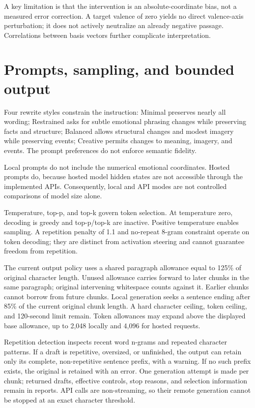 \documentclass[manuscript,screen,nonacm]{acmart}
\begin{document}
A key limitation is that the intervention is an absolute-coordinate
bias, not a measured error correction. A target valence of zero yields
no direct valence-axis perturbation; it does not actively neutralize an
already negative passage. Correlations between basis vectors further
complicate interpretation.

\section{Prompts, sampling, and bounded
output}\label{prompts-sampling-and-bounded-output}

Four rewrite styles constrain the instruction: Minimal preserves nearly
all wording; Restrained asks for subtle emotional phrasing changes while
preserving facts and structure; Balanced allows structural changes and
modest imagery while preserving events; Creative permits changes to
meaning, imagery, and events. The prompt preferences do not enforce
semantic fidelity.

Local prompts do not include the numerical emotional coordinates. Hosted
prompts do, because hosted model hidden states are not accessible
through the implemented APIs. Consequently, local and API modes are not
controlled comparisons of model size alone.

Temperature, top-p, and top-k govern token selection. At temperature
zero, decoding is greedy and top-p/top-k are inactive. Positive
temperature enables sampling. A repetition penalty of 1.1 and no-repeat
8-gram constraint operate on token decoding; they are distinct from
activation steering and cannot guarantee freedom from repetition.

The current output policy uses a shared paragraph allowance equal to
125\% of original character length. Unused allowance carries forward to
later chunks in the same paragraph; original intervening whitespace
counts against it. Earlier chunks cannot borrow from future chunks.
Local generation seeks a sentence ending after 85\% of the current
original chunk length. A hard character ceiling, token ceiling, and
120-second limit remain. Token allowances may expand above the displayed
base allowance, up to 2,048 locally and 4,096 for hosted requests.

Repetition detection inspects recent word n-grams and repeated character
patterns. If a draft is repetitive, oversized, or unfinished, the output
can retain only its complete, non-repetitive sentence prefix, with a
warning. If no such prefix exists, the original is retained with an
error. One generation attempt is made per chunk; returned drafts,
effective controls, stop reasons, and selection information remain in
reports. API calls are non-streaming, so their remote generation cannot
be stopped at an exact character threshold.
\end{document}
